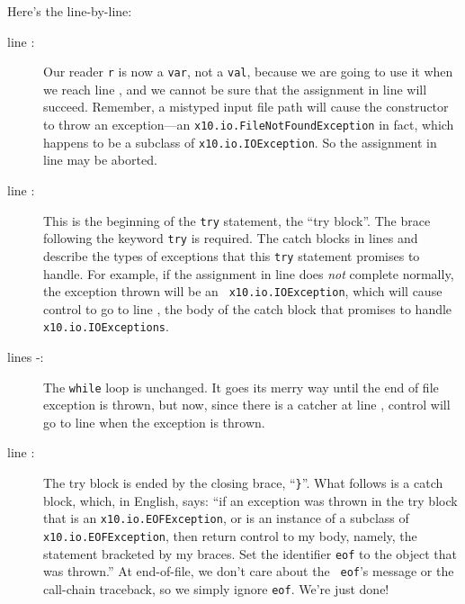 Here's the line-by-line:
\begin{description}
\item[line :]  Our reader {\tt r} is now a {\tt var}, not a {\tt val}, because
we are going to use it when we reach line , and we cannot be sure that the
assignment in line  will succeed.  Remember, a mistyped input file path will
cause the constructor to throw an exception---an
{\tt x10.io.File\-Not\-Found\-Excep\-tion} in fact, which happens to be a
subclass of {\tt x10.io.IO\-Excep\-tion}.  So the assignment in line  may be
aborted.
\item[line :] This is the beginning of the {\tt try} statement, the ``try block''.
The brace following the keyword {\tt try} is required.  The catch blocks in
lines  and  describe the types of exceptions that this {\tt try} statement
promises to handle.  For example, if the assignment in line  does {\em not}
complete normally, the exception thrown will be an {\tt
x10.io.IO\-Excep\-tion}, which will cause control to go to line , the body of
the catch block that promises to handle {\tt x10.io.IO\-Excep\-tions}.
\item[lines -:] The {\tt while} loop is unchanged.  It goes its merry way
until the end of file exception is thrown, but now, since there is a catcher at
line , control will go to line
 when the exception is thrown. 
\item[line :] The try block is ended by the closing brace, ``{\tt \}}''. 
What follows is a catch block, which, in English, says: ``if an exception
was thrown in the try block that is an {\tt x10.io.EOFException}, or is an
instance of a subclass of {\tt x10.io.EOFException}, then return control to my
body, namely, the statement bracketed by my braces.  Set the identifier {\tt eof} 
to the object that was thrown.''  At end-of-file, we don't care about the {\tt
eof}'s message or the call-chain traceback, so we simply ignore {\tt eof}. 
We're just done!


\end{description}
